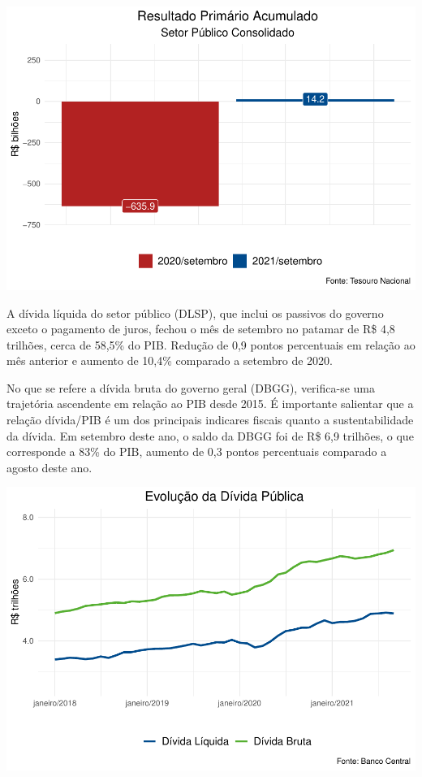 \documentclass[100,a4paperpaper,]{article}
\begin{document}
\includegraphics{politica-fiscal_files/figure-latex/setor publico consolidado-1.pdf}

A dívida líquida do setor público (DLSP), que inclui os passivos do
governo exceto o pagamento de juros, fechou o mês de setembro no patamar
de R\$ 4,8 trilhões, cerca de 58,5\% do PIB. Redução de 0,9 pontos
percentuais em relação ao mês anterior e aumento de 10,4\% comparado a
setembro de 2020.

No que se refere a dívida bruta do governo geral (DBGG), verifica-se uma
trajetória ascendente em relação ao PIB desde 2015. É importante
salientar que a relação dívida/PIB é um dos principais indicares fiscais
quanto a sustentabilidade da dívida. Em setembro deste ano, o saldo da
DBGG foi de R\$ 6,9 trilhões, o que corresponde a 83\% do PIB, aumento
de 0,3 pontos percentuais comparado a agosto deste ano.

\includegraphics{politica-fiscal_files/figure-latex/Divida Liquida e Bruta-1.pdf}
\end{document}

